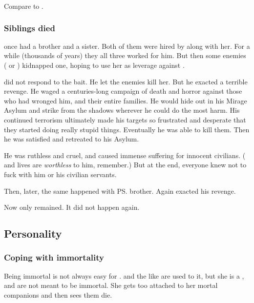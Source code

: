 Compare to . 





\subsubsection{Siblings died}
\Criseis{} once had a brother and a sister. 
Both of them were hired by \Ishnaruchaefir{} along with her. 
For a while (thousands of years) they all three worked for him. 
But then some enemies (\resphain{} or \dragons) kidnapped one, hoping to use her as leverage against \Ishnaruchaefir. 

\Ishnaruchaefir{} did not respond to the bait. 
He let the enemies kill her. 
But he exacted a terrible revenge. 
He waged a centuries-long campaign of death and horror against those who had wronged him, and their entire families. 
He would hide out in his Mirage Asylum and strike from the shadows wherever he could do the most harm. 
His continued terrorism ultimately made his targets so frustrated and desperate that they started doing really stupid things. 
Eventually he was able to kill them. 
Then he was satisfied and retreated to his Asylum. 

He was ruthless and cruel, and caused immense suffering for innocent civilians. 
(\Resphan{} and \human{} lives are \emph{worthless} to him, remember.) 
But at the end, everyone knew not to fuck with him or his civilian servants. 

Then, later, the same happened with \ps{\Criseis} brother. 
Again \Ishnaruchaefir{} exacted his revenge. 

Now only \Criseis{} remained. 
It did not happen again. 









\subsection{Personality}





\subsubsection{Coping with immortality}
Being immortal is not always easy for \Criseis. 
\Dragons{} and the like are used to it, but she is a \scatha, and \scathae{} are not meant to be immortal. 
She gets too attached to her mortal companions and then sees them die. 


